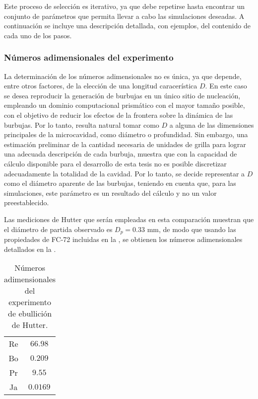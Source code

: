 Este proceso de selecci\'on es iterativo, ya que debe repetirse hasta encontrar un conjunto de par\'ametros que permita llevar a cabo las simulaciones deseadas. A continuaci\'on se incluye una descripci\'on detallada, con ejemplos, del contenido de cada uno de los pasos.


\subsubsection{N\'umeros adimensionales del experimento}

La determinaci\'on de los n\'umeros adimensionales no es \'unica, ya que depende, entre otros factores, de la elecci\'on de una longitud caracer\'istica $D$. En este caso se desea reproducir la generaci\'on de burbujas en un \'unico sitio de nucleaci\'on, empleando un dominio computacional prism\'atico con el mayor tama\~no posible, con el objetivo de reducir los efectos de la frontera sobre la din\'amica de las burbujas. Por lo tanto, resulta natural tomar como $D$ a alguna de las dimensiones principales de la microcavidad, como di\'ametro o profundidad. Sin embargo, una estimaci\'on preliminar de la cantidad necesaria de unidades de grilla para lograr una adecuada descripci\'on de cada burbuja, muestra que con la capacidad de c\'alculo disponible para el desarrollo de esta tesis no es posible discretizar adecuadamente la totalidad de la cavidad. Por lo tanto, se decide representar a $D$ como el di\'ametro aparente de las burbujas, teniendo en cuenta que, para las simulaciones, este par\'ametro es un resultado del c\'alculo y no un valor preestablecido.

Las mediciones de Hutter que ser\'an empleadas en esta comparaci\'on muestran que el di\'ametro de partida observado es $D_p=0.33$ mm, de modo que usando las propiedades de FC-72 incluidas en la , se obtienen los n\'umeros adimensionales detallados en la .
\begin{table}[ht]
	\centering
    \begin{tabular}{c c}
	    \toprule
		Re & $66.98$  \\
		Bo & $0.209$  \\
		Pr & $9.55$   \\
		Ja & $0.0169$ \\
        \bottomrule
	\end{tabular}
	\caption{N\'umeros adimensionales del experimento de ebullici\'on de Hutter.}
	\label{tab:exp_adim}
\end{table} 


